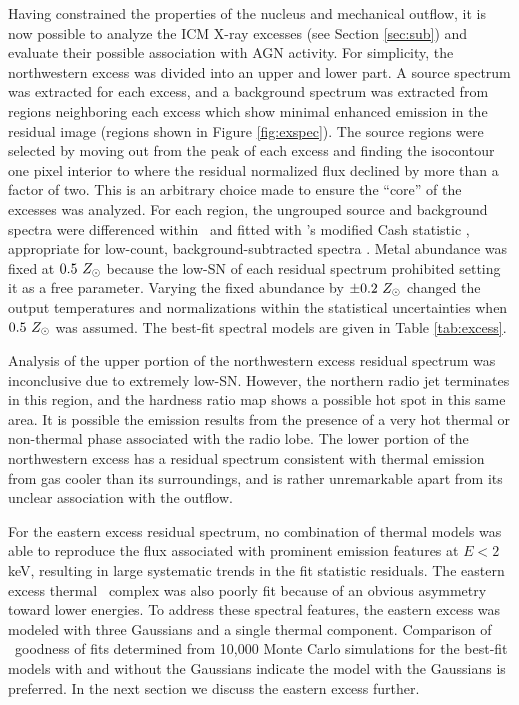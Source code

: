 \documentclass[useAMS,usenatbib]{mn2e}
\begin{document}
Having constrained the properties of the nucleus and mechanical
outflow, it is now possible to analyze the ICM X-ray excesses (see
Section \ref{sec:sub}) and evaluate their possible association with
AGN activity. For simplicity, the northwestern excess was divided into
an upper and lower part. A source spectrum was extracted for each
excess, and a background spectrum was extracted from regions
neighboring each excess which show minimal enhanced emission in the
residual image (regions shown in Figure \ref{fig:exspec}). The source
regions were selected by moving out from the peak of each excess and
finding the isocontour one pixel interior to where the residual
normalized flux declined by more than a factor of two. This is an
arbitrary choice made to ensure the ``core'' of the excesses was
analyzed. For each region, the ungrouped source and background spectra
were differenced within \xspec\ and fitted with \xspec's modified Cash
statistic \citep{1979ApJ...228..939C}, appropriate for low-count,
background-subtracted spectra \citep[see \xspec\ Manual Appendix B
  and][]{1989ApJ...342.1207N}. Metal abundance was fixed at $0.5
~Z_{\odot}$ because the low-SN of each residual spectrum prohibited
setting it as a free parameter. Varying the fixed abundance by $\pm
0.2 ~Z_{\odot}$ changed the output temperatures and normalizations within
the statistical uncertainties when $0.5 ~Z_{\odot}$ was assumed. The
best-fit spectral models are given in Table \ref{tab:excess}.

Analysis of the upper portion of the northwestern excess residual
spectrum was inconclusive due to extremely low-SN. However, the
northern radio jet terminates in this region, and the hardness ratio
map shows a possible hot spot in this same area. It is possible the
emission results from the presence of a very hot thermal or
non-thermal phase associated with the radio lobe. The lower portion of
the northwestern excess has a residual spectrum consistent with
thermal emission from gas cooler than its surroundings, and is rather
unremarkable apart from its unclear association with the outflow.

For the eastern excess residual spectrum, no combination of thermal
models was able to reproduce the flux associated with prominent
emission features at $E < 2$ keV, resulting in large systematic trends
in the fit statistic residuals. The eastern excess thermal
\feka\ complex was also poorly fit because of an obvious asymmetry
toward lower energies. To address these spectral features, the eastern
excess was modeled with three Gaussians and a single thermal
component. Comparison of \chisq\ goodness of fits determined from
10,000 Monte Carlo simulations for the best-fit models with and
without the Gaussians indicate the model with the Gaussians is
preferred. In the next section we discuss the eastern excess further.
\end{document}
